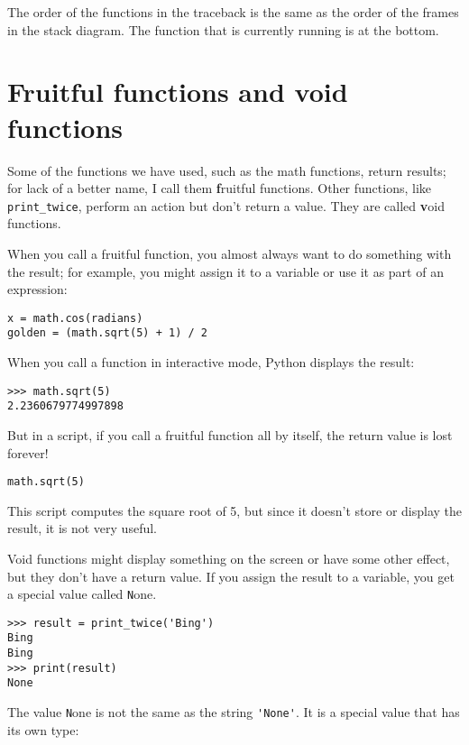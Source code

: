 \documentclass[
DIV=11,
fontsize=12,
twoside,
headinclude=false,
titlepage=firstiscover,
abstract=true,
headsepline=true,
footsepline=true,
chapterprefix=true, %
headings=big,
bibliography=totoc,%
captions=tableheading
]{scrbook}
\theoremstyle{definition}
\begin{document}
The order of the functions in the traceback is the same as the
order of the frames in the stack diagram.  The function that is
currently running is at the bottom.


\section{Fruitful functions and void functions}

Some of the functions we have used, such as the math functions, return
results; for lack of a better name, I call them {\textbf fruitful
  functions}.  Other functions, like \verb"print_twice", perform an
action but don't return a value.  They are called {\textbf void
  functions}.

When you call a fruitful function, you almost always
want to do something with the result; for example, you might
assign it to a variable or use it as part of an expression:

\begin{lstlisting}
x = math.cos(radians)
golden = (math.sqrt(5) + 1) / 2
\end{lstlisting}
%
When you call a function in interactive mode, Python displays
the result:

\begin{lstlisting}
>>> math.sqrt(5)
2.2360679774997898
\end{lstlisting}
%
But in a script, if you call a fruitful function all by itself,
the return value is lost forever!

\begin{lstlisting}
math.sqrt(5)
\end{lstlisting}
%
This script computes the square root of 5, but since it doesn't store
or display the result, it is not very useful.

Void functions might display something on the screen or have some
other effect, but they don't have a return value.  If you
assign the result to a variable, you get a special value called
{\texttt None}.

\begin{lstlisting}
>>> result = print_twice('Bing')
Bing
Bing
>>> print(result)
None
\end{lstlisting}
%
The value {\texttt None} is not the same as the string \verb"'None'". 
It is a special value that has its own type:
\end{document}
